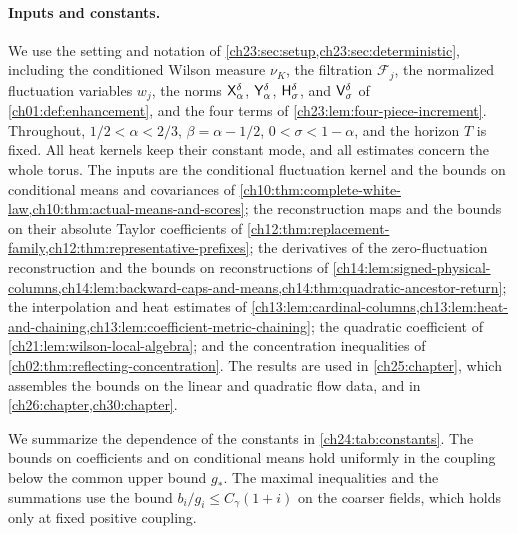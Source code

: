 \paragraph{Inputs and constants.}
We use the setting and notation of \cref{ch23:sec:setup,ch23:sec:deterministic}, including the conditioned Wilson measure $\nu_K$, the filtration $\mathcal F_j$, the normalized fluctuation variables $w_j$, the norms $\mathsf X_{\alpha}^{\delta}$, $\mathsf Y_{\alpha}^{\delta}$, $\mathsf H_{\sigma}^{\delta}$, and $\mathsf V_{\sigma}^{\delta}$ of \cref{ch01:def:enhancement}, and the four terms of \cref{ch23:lem:four-piece-increment}. Throughout, $1/2<\alpha<2/3$, $\beta=\alpha-1/2$, $0<\sigma<1-\alpha$, and the horizon $T$ is fixed. All heat kernels keep their constant mode, and all estimates concern the whole torus. The inputs are the conditional fluctuation kernel and the bounds on conditional means and covariances of \cref{ch10:thm:complete-white-law,ch10:thm:actual-means-and-scores}; the reconstruction maps and the bounds on their absolute Taylor coefficients of \cref{ch12:thm:replacement-family,ch12:thm:representative-prefixes}; the derivatives of the zero-fluctuation reconstruction and the bounds on reconstructions of \cref{ch14:lem:signed-physical-columns,ch14:lem:backward-caps-and-means,ch14:thm:quadratic-ancestor-return}; the interpolation and heat estimates of \cref{ch13:lem:cardinal-columns,ch13:lem:heat-and-chaining,ch13:lem:coefficient-metric-chaining}; the quadratic coefficient of \cref{ch21:lem:wilson-local-algebra}; and the concentration inequalities of \cref{ch02:thm:reflecting-concentration}. The results are used in \cref{ch25:chapter}, which assembles the bounds on the linear and quadratic flow data, and in \cref{ch26:chapter,ch30:chapter}.

We summarize the dependence of the constants in \cref{ch24:tab:constants}. The bounds on coefficients and on conditional means hold uniformly in the coupling below the common upper bound $g_*$. The maximal inequalities and the summations use the bound $b_i/g_i\le C_\gamma(1+i)$ on the coarser fields, which holds only at fixed positive coupling.

